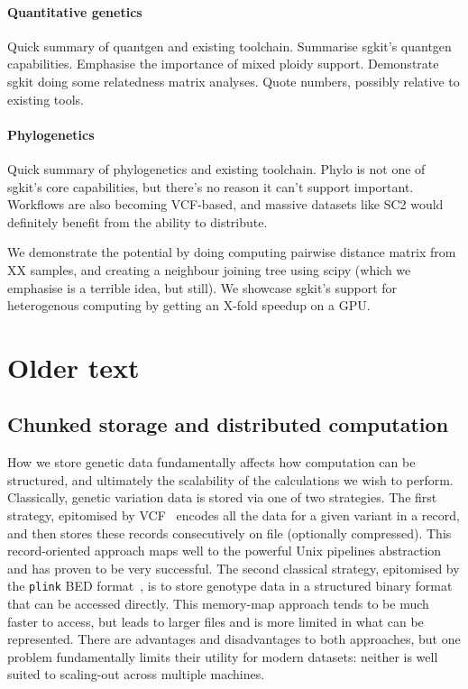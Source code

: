 \documentclass[a4paper,num-refs]{oup-contemporary}
\begin{document}
\paragraph{Quantitative genetics}
Quick summary of quantgen and existing toolchain.
Summarise sgkit's quantgen capabilities. Emphasise the importance
of mixed ploidy support.
Demonstrate sgkit doing some relatedness matrix analyses.
Quote numbers, possibly relative to existing tools.

\paragraph{Phylogenetics}
Quick summary of phylogenetics and existing toolchain.
Phylo is not one of sgkit's core capabilities, but there's no
reason it can't support important. Workflows are also becoming
VCF-based, and massive datasets like SC2 would definitely
benefit from the ability to distribute.

We demonstrate the potential by doing computing pairwise
distance matrix from XX samples, and creating a neighbour
joining tree using scipy (which we emphasise is a terrible
idea, but still). We showcase sgkit's support for heterogenous
computing by getting an X-fold speedup on a GPU.

\section{Older text}

\subsection{Chunked storage and distributed computation}
How we store genetic data fundamentally affects how computation
can be structured, and ultimately the scalability of the calculations
we wish to perform. Classically, genetic variation data is stored via one
of two strategies. The first strategy, epitomised by
VCF~\citep{danecek2011variant} encodes all the data for a given
variant in a record, and then stores these records consecutively on file
(optionally compressed). This record-oriented approach maps well to the
powerful Unix pipelines abstraction and
has proven to be very successful.
The second classical strategy, epitomised
by the \texttt{plink} BED format~\citep{purcell2007plink}, is to
store genotype data in a structured binary format that can be
accessed directly. This memory-map approach tends to
be much faster to access, but leads to larger files and is more
limited in what can be represented. There are advantages and
disadvantages to both approaches, but one problem fundamentally
limits their utility for modern datasets: neither is well suited to
scaling-out across multiple machines.
\end{document}
